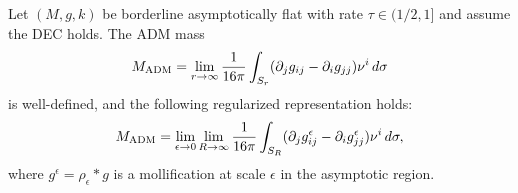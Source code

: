 \begin{theorem}\label{thm:BorderlineMass}
Let $(M, g, k)$ be borderline asymptotically flat with rate $\tau \in (1/2, 1]$ and assume the DEC holds. The ADM mass
\begin{equation}
    M_{\mathrm{ADM}} = \lim_{r \to \infty} \frac{1}{16\pi} \int_{S_r} (\partial_j g_{ij} - \partial_i g_{jj}) \nu^i \, d\sigma
\end{equation}
is well-defined, and the following regularized representation holds:
\begin{equation}\label{eq:MassRegularized}
    M_{\mathrm{ADM}} = \lim_{\epsilon \to 0} \lim_{R \to \infty} \frac{1}{16\pi} \int_{S_R} (\partial_j g^\epsilon_{ij} - \partial_i g^\epsilon_{jj}) \nu^i \, d\sigma,
\end{equation}
where $g^\epsilon = \rho_\epsilon * g$ is a mollification at scale $\epsilon$ in the asymptotic region.
\end{theorem}

